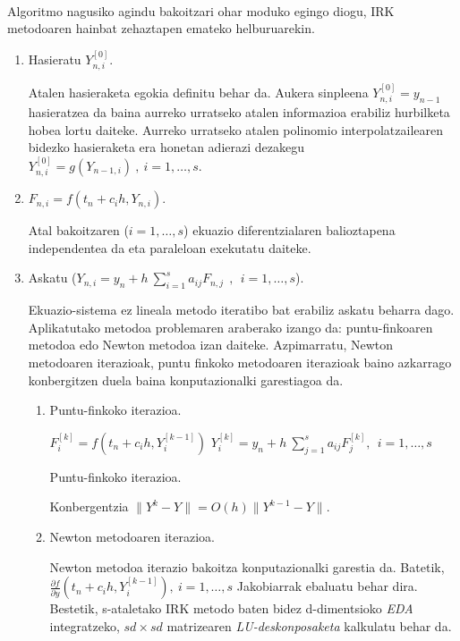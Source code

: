 \paragraph*{}Algoritmo nagusiko agindu bakoitzari ohar moduko egingo diogu, IRK metodoaren hainbat zehaztapen emateko helburuarekin.
\begin{enumerate}
\item Hasieratu  $Y_{n,i}^{[0]}$.

Atalen hasieraketa egokia definitu behar da. Aukera sinpleena $Y_{n,i}^{[0]}=y_{n-1}$ hasieratzea da baina aurreko urratseko atalen informazioa erabiliz hurbilketa hobea lortu daiteke. Aurreko urratseko atalen polinomio interpolatzailearen bidezko hasieraketa era honetan adierazi dezakegu  $Y_{n,i}^{[0]}=g(Y_{n-1,i}) \ , \ i=1, \dots, s$.      

\item $F_{n,i}=f(t_n+c_ih,Y_{n,i})$.

Atal bakoitzaren ($i=1,\dots,s$) ekuazio diferentzialaren balioztapena independentea da eta paraleloan exekutatu daiteke.

\item   Askatu ($Y_{n,i}=y_{n}+ h \ \sum\limits_{i=1}^{s} a_{ij} F_{n,j}  \ \ , \ \  i=1,\dots,s$).

Ekuazio-sistema ez lineala metodo iteratibo bat erabiliz askatu beharra dago. Aplikatutako metodoa problemaren araberako izango da: puntu-finkoaren metodoa edo Newton  metodoa izan daiteke. Azpimarratu, Newton metodoaren iterazioak, puntu finkoko metodoaren iterazioak baino azkarrago konbergitzen duela baina konputazionalki garestiagoa da. 

\begin{enumerate}

\item Puntu-finkoko iterazioa.


\begin{algorithm}[H]
  {
   $F_{i}^{[k]}=f(t_n+c_ih,Y_i^{[k-1]})$\;
   $Y_{i}^{[k]}=y_{n}+ h \ \sum\limits_{j=1}^{s} a_{ij} F_{j}^{[k]} , \ \  i=1,\dots,s$\; 
  }
 \caption{Puntu-finkoko iterazioa.}
\end{algorithm}

Konbergentzia $\|Y^k-Y\|=O(h) \|Y^{k-1}-Y\|$.


\item Newton metodoaren iterazioa. 

Newton metodoa iterazio bakoitza konputazionalki garestia da. Batetik,  $\frac{\partial f}{\partial y}(t_n+c_ih,Y_i^{[k-1]}), \ i=1,\dots,s$ Jakobiarrak ebaluatu behar dira. Bestetik, s-ataletako IRK metodo baten bidez d-dimentsioko \emph{EDA} integratzeko, $sd \times sd$ matrizearen \emph{LU-deskonposaketa} kalkulatu behar da.    



\end{enumerate}
\end{enumerate}
